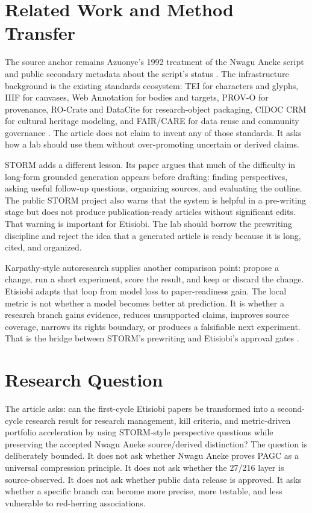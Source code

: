 \documentclass[sigconf,nonacm]{acmart}
\begin{document}
\section{Related Work and Method Transfer}
The source anchor remains Azuonye's 1992 treatment of the Nwagu Aneke script and
public secondary metadata about the script's status \cite{azuonye1992,omniglotNwagu,scriptSourceNwagu,unicodeAfricanScripts2023}.
The infrastructure background is the existing standards ecosystem: TEI for
characters and glyphs, IIIF for canvases, Web Annotation for bodies and targets,
PROV-O for provenance, RO-Crate and DataCite for research-object packaging,
CIDOC CRM for cultural heritage modeling, and FAIR/CARE for data reuse and
community governance \cite{teiP5Glyphs,iiifPresentation3,w3cAnnotationModel,w3cProvO,rocrate12,cidocCrm,datacite45,wilkinson2016fair,carroll2020care}. The article does not claim to invent
any of those standards. It asks how a lab should use them without over-promoting
uncertain or derived claims.

STORM adds a different lesson. Its paper argues that much of the difficulty in
long-form grounded generation appears before drafting: finding perspectives,
asking useful follow-up questions, organizing sources, and evaluating the
outline. The public STORM project also warns that the system is helpful in a
pre-writing stage but does not produce publication-ready articles without
significant edits. That warning is important for Etisiobi. The lab should borrow
the prewriting discipline and reject the idea that a generated article is ready
because it is long, cited, and organized.

Karpathy-style autoresearch supplies another comparison point: propose a change,
run a short experiment, score the result, and keep or discard the change. Etisiobi
adapts that loop from model loss to paper-readiness gain. The local metric is
not whether a model becomes better at prediction. It is whether a research
branch gains evidence, reduces unsupported claims, improves source coverage,
narrows its rights boundary, or produces a falsifiable next experiment. That is
the bridge between STORM's prewriting and Etisiobi's approval gates
\cite{karpathyAutoresearch,shao2024storm,jiang2024costorm}.

\section{Research Question}
The article asks: can the first-cycle Etisiobi papers be transformed into a
second-cycle research result for research management, kill criteria, and metric-driven portfolio acceleration by using STORM-style perspective
questions while preserving the accepted Nwagu Aneke source/derived distinction?
The question is deliberately bounded. It does not ask whether Nwagu Aneke proves
PAGC as a universal compression principle. It does not ask whether the 27/216
layer is source-observed. It does not ask whether public data release is
approved. It asks whether a specific branch can become more precise, more
testable, and less vulnerable to red-herring associations.
\end{document}
